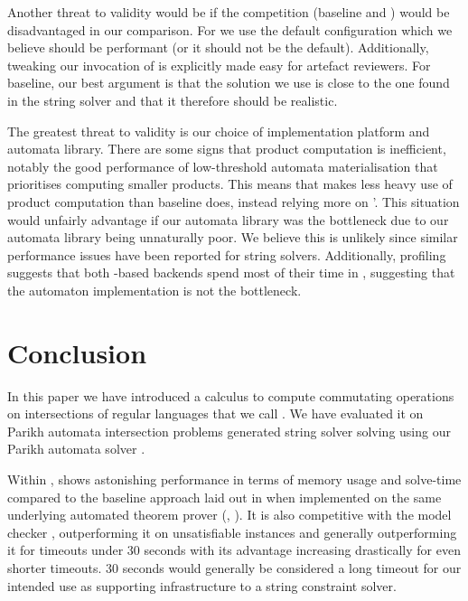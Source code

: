 \documentclass[acmsmall,review,anonymous,screen]{acmart}\settopmatter{printfolios=true,printccs=false,printacmref=true}
\theoremstyle{definition}
\begin{document}
Another threat to validity would be if the competition (baseline and \Nuxmv)
would be disadvantaged in our comparison. For \Nuxmv{} we use the default
configuration which we believe should be performant (or it should not be the
default). Additionally, tweaking our invocation of \Nuxmv{} is explicitly made
easy for artefact reviewers. For baseline, our best argument is that the
solution we use is close to the one found in the \Ostrich{} string solver and
that it therefore should be realistic.

The greatest threat to validity is our choice of implementation platform and
automata library. There are some signs that product computation is inefficient,
notably the good performance of low-threshold automata materialisation that
prioritises computing smaller products. This means that \Calculus{} makes less
heavy use of product computation than baseline does, instead relying more on
\Princess{}'. This situation would unfairly advantage \Calculus{} if our
automata library was the bottleneck due to our automata library being
unnaturally poor. We believe this is unlikely since similar performance issues
have been reported for string solvers. Additionally, profiling suggests that
both \Princess{}-based backends spend most of their time in \Princess{},
suggesting that the automaton implementation is not the bottleneck.

\section{Conclusion}

In this paper we have introduced a calculus to compute commutating operations on
intersections of regular languages that we call \Calculus{}. We have evaluated
it on \NrBenchmarks{} Parikh automata intersection problems generated  string solver \cite{ostrich} solving  using our Parikh automata solver \Catra{}.

Within \Catra{}, \Calculus{} shows astonishing performance in terms of memory
usage and solve-time compared to the baseline approach laid out in
\cite{generate-parikh-image} when implemented on the same underlying automated
theorem prover (\Princess{}, \cite{princess}). It is also competitive with the
\Nuxmv{} model checker \cite{nuxmv}, outperforming it on unsatisfiable instances
and generally outperforming it for timeouts under 30 seconds with its advantage
increasing drastically for even shorter timeouts. 30 seconds would generally be
considered a long timeout for our intended use as supporting infrastructure to a
string constraint solver.
\end{document}
